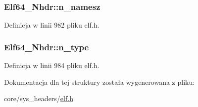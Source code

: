 \hypertarget{struct_elf64___nhdr_a1169a3f8272ba5265ea3aecdc4974546}{
\subsubsection[{n\-\_\-namesz}]{ Elf64\-\_\-\-Nhdr\-::n\-\_\-namesz}}\label{struct_elf64___nhdr_a1169a3f8272ba5265ea3aecdc4974546}


Definicja w linii 982 pliku elf.\-h.

\hypertarget{struct_elf64___nhdr_abbb820712cc219d235bb7eb3c11eefbe}{
\subsubsection[{n\-\_\-type}]{ Elf64\-\_\-\-Nhdr\-::n\-\_\-type}}\label{struct_elf64___nhdr_abbb820712cc219d235bb7eb3c11eefbe}


Definicja w linii 984 pliku elf.\-h.



Dokumentacja dla tej struktury została wygenerowana z pliku\-:\begin{DoxyCompactItemize}
\item 
core/sys\-\_\-headers/\hyperlink{elf_8h}{elf.\-h}\end{DoxyCompactItemize}
